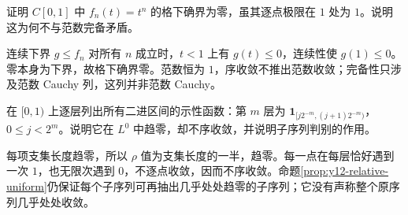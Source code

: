 \begin{exercise}[连续函数中的序]\label{ex:y12-continuous-order}
证明 $C[0,1]$ 中 $f_n(t)=t^n$ 的格下确界为零，虽其逐点极限在 $1$ 处为 $1$。说明这为何不与范数完备矛盾。
\end{exercise}
\begin{solution}
连续下界 $g\le f_n$ 对所有 $n$ 成立时，$t<1$ 上有 $g(t)\le0$，连续性使 $g(1)\le0$。零本身为下界，故格下确界零。范数恒为 $1$，序收敛不推出范数收敛；完备性只涉及范数 Cauchy 列，这列并非范数 Cauchy。
\end{solution}

\begin{exercise}[依测度与逐点]\label{ex:y12-typewriter}
在 $[0,1)$ 上逐层列出所有二进区间的示性函数：第 $m$ 层为 $\mathbf1_{[j2^{-m},(j+1)2^{-m})}$，$0\le j<2^m$。说明它在 $L^0$ 中趋零，却不序收敛，并说明子序列判别的作用。
\end{exercise}
\begin{solution}
每项支集长度趋零，所以 $\rho$ 值为支集长度的一半，趋零。每一点在每层恰好遇到一次 $1$，也无限次遇到 $0$，不逐点收敛，因而不序收敛。命题\ref{prop:y12-relative-uniform}仍保证每个子序列可再抽出几乎处处趋零的子序列；它没有声称整个原序列几乎处处收敛。
\end{solution}
